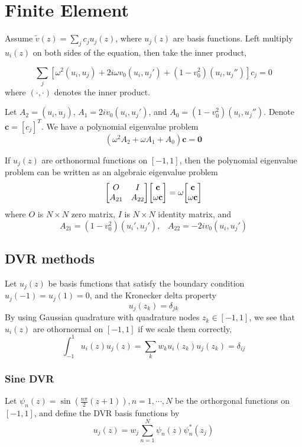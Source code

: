 \documentclass{article}
\begin{document}
\newpage
\section{Finite Element}
Assume $\tilde{v}(z) = \sum_{j} c_ju_j(z)$, where $u_j(z)$ are basis functions. Left multiply $u_i(z)$ on both sides of the equation, then take the inner product,

$$ \sum_{j} \left[ \omega^2 (u_i,u_j)  + 2i\omega v_0 (u_i,u_j') + (1-v_0^2)(u_i,u_j'') \right]c_j = 0 $$
where $(\cdot,\cdot)$ denotes the inner product.

Let $A_2=(u_i,u_j)$, $A_1=2iv_0(u_i,u_j')$, and $A_0=(1-v_0^2)(u_i,u_j'')$. Denote $\mathbf{c} = [c_j]^T$. We have a polynomial eigenvalue problem
$$ (\omega^2 A_2 + \omega A_1 + A_0)\mathbf{c} = \mathbf{0} $$

If $u_j(z)$ are orthonormal functions on $[-1,1]$, then the polynomial eigenvalue problem can be written as an algebraic eigenvalue problem
$$ 
\mqty[ O & I \\ A_{21} & A_{22} ]\mqty[\mathbf{c} \\ \omega\mathbf{c}]
= \omega\mqty[\mathbf{c} \\ \omega\mathbf{c}]
$$
where $O$ is $N\times N$ zero matrix, $I$ is $N\times N$ identity matrix, and
$$ A_{21} = (1-v_0^2)(u_i',u_j'),\;\;\; A_{22} = -2iv_0(u_i,u_j') $$

\subsection{DVR methods}
Let $u_j(z)$ be basis functions that satisfy the boundary condition $u_j(-1)=u_j(1)=0$, and the Kronecker delta property
$$ u_j(z_k) = \delta_{jk} $$
By using Gaussian quadrature with quadrature nodes $z_k\in[-1,1]$, we see that $u_i(z)$ are othornormal on $[-1,1]$ if we scale them correctly,
$$ \int_{-1}^{1} u_i(z)u_j(z) = \sum_{k} w_ku_i(z_k)u_j(z_k) = \delta_{ij} $$



\subsubsection{Sine DVR}
Let $\psi_n(z) = \sin(\frac{n\pi}{2}(z+1)), n=1,\cdots,N$ be the orthorgonal functions on $[-1,1]$, and define the DVR basis functions by
$$ u_j(z) = w_j\sum_{n=1}^N \psi_n(z)\psi_n^*(z_j) $$
\end{document}
